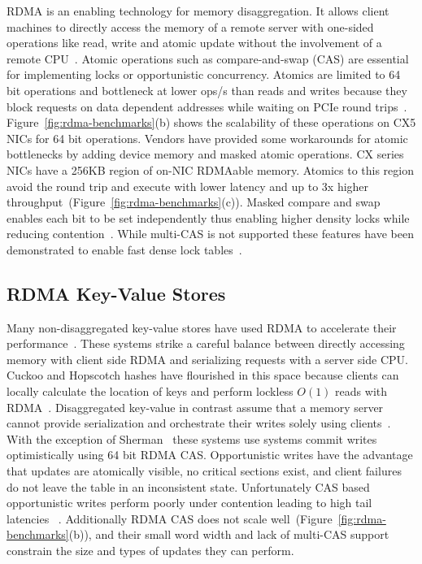 RDMA is an enabling technology for memory disaggregation. It
allows client machines to directly access the memory of a
remote server with one-sided operations like read, write and
atomic update without the involvement of a remote
CPU~\cite{infiniband-spec}.  
Atomic operations such as compare-and-swap (CAS) are
essential for implementing locks or opportunistic
concurrency. Atomics are limited to 64 bit operations and
bottleneck at lower ops/s than reads and writes because they
block requests on data dependent addresses while waiting on
PCIe round trips~\cite{design-guidelines,sherman}.
Figure~\ref{fig:rdma-benchmarks}(b) shows the scalability of
these operations on CX5 NICs for 64 bit operations.
Vendors have provided some workarounds for atomic
bottlenecks by adding device memory and masked atomic
operations. CX series NICs have a 256KB region of on-NIC
RDMAable memory. Atomics to this region avoid the round trip
and execute with lower latency and up to 3x higher
throughput~\cite{device-memory}(Figure~\ref{fig:rdma-benchmarks}(c)).
Masked compare and swap enables each bit to be set
independently thus enabling higher density locks while
reducing contention~\cite{rdma-masked-cas}. While multi-CAS
is not supported these features have been demonstrated to
enable fast dense lock tables~\cite{sherman}.


\subsection{RDMA Key-Value Stores}

Many non-disaggregated key-value stores have used RDMA to
accelerate their
performance~\cite{farm,memc3,erpc,herd,faast,mica,pilaf,cell,storm}.
These systems strike a careful balance between directly
accessing memory with client side RDMA and serializing
requests with a server side CPU.
Cuckoo and Hopscotch hashes have flourished in this space
because clients can locally calculate the location of keys
and perform lockless $O(1)$ reads with
RDMA~\cite{hopscotch,farm,pilaf,cuckoo}.
Disaggregated key-value in contrast assume that a memory
server cannot provide serialization and orchestrate their
writes solely using
clients~\cite{rolex,fusee,clover,sherman,ford,race}. With
the exception of Sherman~\cite{sherman} these systems use
systems commit writes optimistically using 64 bit RDMA CAS. 
Opportunistic writes have the advantage that updates are
atomically visible, no critical sections exist, and client
failures do not leave the table in an inconsistent state.
Unfortunately CAS based opportunistic writes perform poorly
under contention leading to high tail latencies
~\cite{clover}. Additionally RDMA CAS does not scale
well~\cite{design-guidelines}(Figure~\ref{fig:rdma-benchmarks}(b)),
and their small word width and lack of multi-CAS support
constrain the size and types of updates they can perform.

